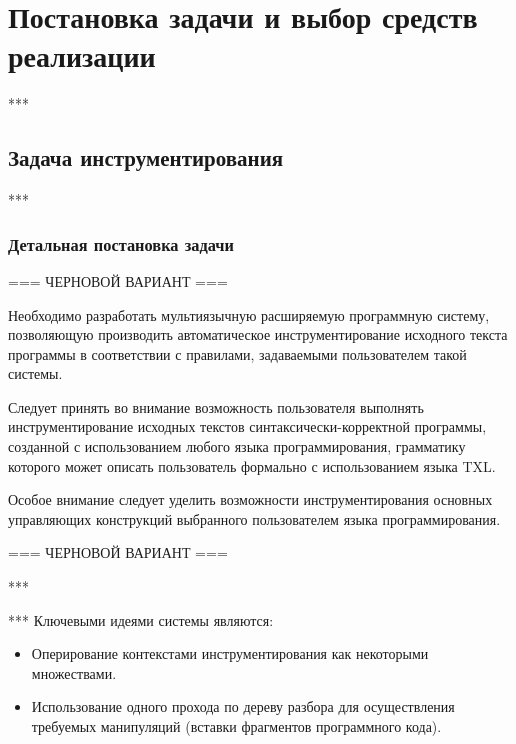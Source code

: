 \chapter{Постановка задачи и выбор средств реализации}

***

\section{Задача инструментирования}

***

\subsection{Детальная постановка задачи}

=== ЧЕРНОВОЙ ВАРИАНТ ===

Необходимо разработать мультиязычную расширяемую программную систему, позволяющую производить автоматическое инструментирование исходного текста программы в соответствии с правилами, задаваемыми пользователем такой системы.

Следует принять во внимание возможность пользователя выполнять инструментирование исходных текстов синтаксически-корректной программы, созданной с использованием любого языка программирования, грамматику которого может описать пользователь формально с использованием языка TXL.

Особое внимание следует уделить возможности инструментирования основных управляющих конструкций выбранного пользователем языка программирования.

=== ЧЕРНОВОЙ ВАРИАНТ ===

***

***
Ключевыми идеями системы являются:
\begin{itemize}[noitemsep]
  \item Оперирование контекстами инструментирования как некоторыми множествами.
  \item Использование одного прохода по дереву разбора для осуществления требуемых манипуляций (вставки фрагментов программного кода).
\end{itemize}

